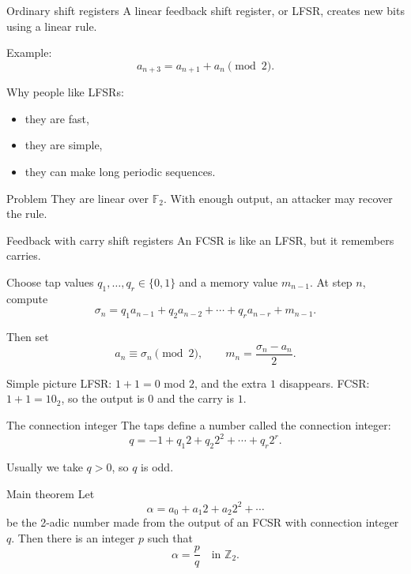 \documentclass[aspectratio=169]{beamer}
\newcommand{\Ztwo}{\mathbb{Z}_2}
\newcommand{\Ftwo}{\mathbb{F}_2}
\begin{document}
\begin{frame}{Ordinary shift registers}
A linear feedback shift register, or LFSR, creates new bits using a linear rule.

Example:
\[
  a_{n+3}=a_{n+1}+a_n \pmod 2.
\]

\vspace{0.3cm}
Why people like LFSRs:
\begin{itemize}
  \item they are fast,
  \item they are simple,
  \item they can make long periodic sequences.
\end{itemize}

\begin{alertblock}{Problem}
They are linear over $\Ftwo$. With enough output, an attacker may recover the rule.
\end{alertblock}
\end{frame}

\begin{frame}{Feedback with carry shift registers}
An FCSR is like an LFSR, but it remembers carries.

Choose tap values $q_1,\ldots,q_r\in\{0,1\}$ and a memory value $m_{n-1}$.
At step $n$, compute
\[
  \sigma_n=q_1a_{n-1}+q_2a_{n-2}+\cdots+q_ra_{n-r}+m_{n-1}.
\]

Then set
\[
  a_n \equiv \sigma_n \pmod 2,
  \qquad
  m_n=\frac{\sigma_n-a_n}{2}.
\]

\begin{block}{Simple picture}
LFSR: $1+1=0$ mod $2$, and the extra $1$ disappears.\newline
FCSR: $1+1=10_2$, so the output is $0$ and the carry is $1$.
\end{block}
\end{frame}

\begin{frame}{The connection integer}
The taps define a number called the connection integer:
\[
  q=-1+q_1 2+q_2 2^2+\cdots+q_r2^r.
\]

Usually we take $q>0$, so $q$ is odd.

\vspace{0.4cm}
\begin{block}{Main theorem}
Let
\[
  \alpha=a_0+a_1 2+a_2 2^2+\cdots
\]
be the 2-adic number made from the output of an FCSR with connection integer $q$.
Then there is an integer $p$ such that
\[
  \alpha=\frac{p}{q} \quad \text{in }\Ztwo.
\]
\end{block}
\end{frame}
\end{document}
